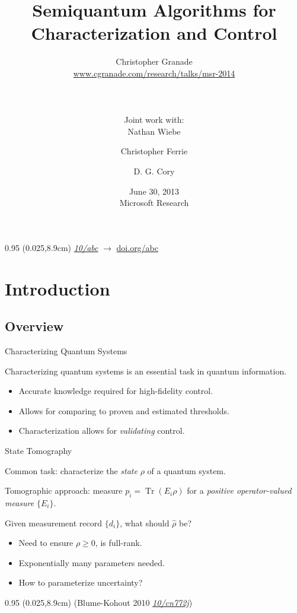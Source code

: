 \documentclass[xcolor=dvipsnames, compress]{beamer}
\title{Semiquantum Algorithms for Characterization and Control}
\author[Granade, Wiebe, Ferrie and Cory]{
  Christopher Granade  \\
  {\tiny \url{www.cgranade.com/research/talks/msr-2014}} \\
  \rule{0.35\textwidth}{0.125pt}\\
  {\footnotesize Joint work with:}\\
  Nathan Wiebe \and
  Christopher Ferrie \and
  D. G. Cory
}
\institute[IQC]{
  Institute for Quantum Computing\\
  University of Waterloo, Ontario, Canada
}
\date[June 2014]{
  June 30, 2013 \\
  {\footnotesize Microsoft Research}
}
\renewcommand\UrlFont{\color{red}\rmfamily\itshape}
\newcommand{\shortdoi}[1]{\href{http://doi.org/#1}{\UrlFont 10/#1}}
\newcommand{\Tr}{\operatorname{Tr}}
\newcommand{\bottomnote}[1]{
  \begin{textblock*}{0.95\paperwidth} (0.025\paperwidth,8.9cm)
    {\tiny \hfill #1}
  \end{textblock*}
}
\begin{document}
\begin{frame}[plain]
  \titlepage
  \bottomnote{\shortdoi{abc} $\to$ \url{doi.org/abc}} 
\end{frame}

\section{Introduction}
\subsection{Overview}

\begin{frame}{Characterizing Quantum Systems}

  Characterizing quantum systems is an essential task in quantum information.

  \begin{itemize}
    \item Accurate knowledge required for high-fidelity control.
    \item Allows for comparing to proven and estimated thresholds.
    \item Characterization allows for \emph{validating} control.
  \end{itemize}

\end{frame}

\begin{frame}{State Tomography}

  Common task: characterize the \emph{state} $\rho$ of a quantum system.

  Tomographic approach: measure $p_i = \Tr(E_i\rho)$ for a \emph{positive operator-valued measure}
  $\{E_i\}$.


  Given measurement record $\{d_i\}$, what should $\hat{\rho}$ be?

  \begin{itemize}
    \item Need to ensure $\rho \ge 0$, is full-rank.
    \item Exponentially many parameters needed.
    \item How to parameterize uncertainty?
  \end{itemize}

  \bottomnote{(Blume-Kohout 2010 \shortdoi{cn772j})}

\end{frame}
\end{document}
